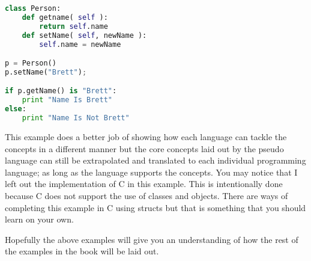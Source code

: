 \begin{lstlisting}[language=python,caption={Example 2 - Python}]
class Person:
    def getname( self ):
        return self.name
    def setName( self, newName ):
        self.name = newName

p = Person()
p.setName("Brett");

if p.getName() is "Brett":
    print "Name Is Brett"
else:
    print "Name Is Not Brett"
\end{lstlisting}

This example does a better job of showing how each language can tackle the concepts in a different manner but the core concepts
laid out by the pseudo language can still be extrapolated and translated to each individual programming language; as long as the language supports the concepts.
You may notice that I left out the implementation of C in this example.
This is intentionally done because C does not support the use of classes and objects.  There are ways of completing this example in C using structs but that
is something that you should learn on your own.
\par

Hopefully the above examples will give you an understanding of how the rest of the examples in the book will be laid out.
